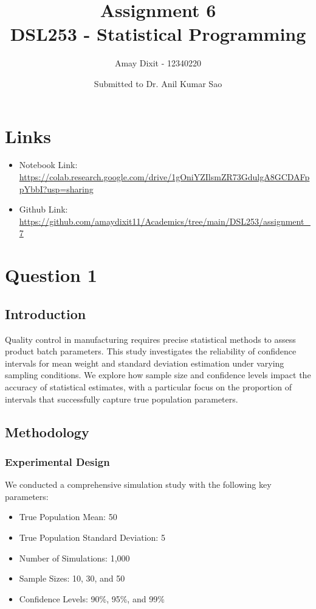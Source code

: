 \documentclass[12pt]{article}
\title{Assignment 6 \\ DSL253 - Statistical Programming}
\author{Amay Dixit - 12340220}
\date{Submitted to Dr. Anil Kumar Sao}
\begin{document}
\maketitle

\section*{Links}
\begin{sloppypar}
\begin{itemize}
    \item Notebook Link: \\ \url{https://colab.research.google.com/drive/1gOniYZIlsmZR73GdulgA8GCDAFppYbbI?usp=sharing}
    \item Github Link: \\ \url{https://github.com/amaydixit11/Academics/tree/main/DSL253/assignment_7}
\end{itemize}
\end{sloppypar}

\section{Question 1}

\subsection{Introduction}
Quality control in manufacturing requires precise statistical methods to assess product batch parameters. This study investigates the reliability of confidence intervals for mean weight and standard deviation estimation under varying sampling conditions. We explore how sample size and confidence levels impact the accuracy of statistical estimates, with a particular focus on the proportion of intervals that successfully capture true population parameters.

\subsection{Methodology}
\subsubsection{Experimental Design}
We conducted a comprehensive simulation study with the following key parameters:
\begin{itemize}
    \item True Population Mean: 50
    \item True Population Standard Deviation: 5
    \item Number of Simulations: 1,000
    \item Sample Sizes: 10, 30, and 50
    \item Confidence Levels: 90\%, 95\%, and 99\%
\end{itemize}
\end{document}

